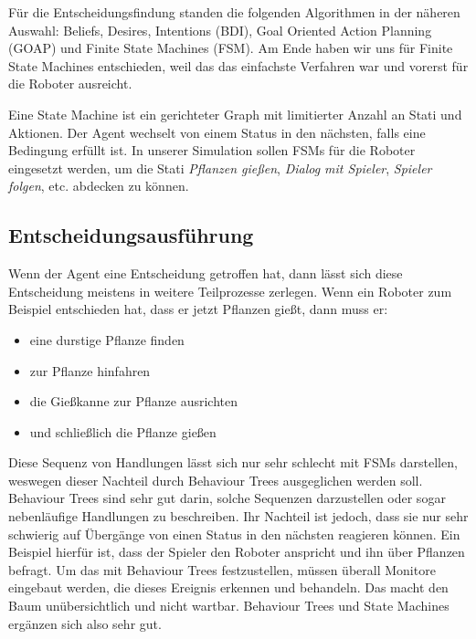 Für die Entscheidungsfindung standen die folgenden Algorithmen in der näheren Auswahl: Beliefs, Desires, Intentions (BDI), Goal Oriented Action Planning (GOAP) und Finite State Machines (FSM). Am Ende haben wir uns für Finite State Machines entschieden, weil das das einfachste Verfahren war und vorerst für die Roboter ausreicht.

Eine State Machine ist ein gerichteter Graph mit limitierter Anzahl an Stati und Aktionen. Der Agent wechselt von einem Status in den nächsten, falls eine Bedingung erfüllt ist. In unserer Simulation sollen FSMs für die Roboter eingesetzt werden, um die Stati \textit{Pflanzen gießen}, \textit{Dialog mit Spieler}, \textit{Spieler folgen}, etc. abdecken zu können. 

\subsection{Entscheidungsausführung}

Wenn der Agent eine Entscheidung getroffen hat, dann lässt sich diese Entscheidung meistens in weitere Teilprozesse zerlegen. Wenn ein Roboter zum Beispiel entschieden hat, dass er jetzt Pflanzen gießt, dann muss er:

\begin{itemize}
\item eine durstige Pflanze finden
\item zur Pflanze hinfahren
\item die Gießkanne zur Pflanze ausrichten
\item und schließlich die Pflanze gießen
\end{itemize}

Diese Sequenz von Handlungen lässt sich nur sehr schlecht mit FSMs darstellen, weswegen dieser Nachteil durch Behaviour Trees ausgeglichen werden soll. Behaviour Trees sind sehr gut darin, solche Sequenzen darzustellen oder sogar nebenläufige Handlungen zu beschreiben. Ihr Nachteil ist jedoch, dass sie nur sehr schwierig auf Übergänge von einen Status in den nächsten reagieren können. Ein Beispiel hierfür ist, dass der Spieler den Roboter anspricht und ihn über Pflanzen befragt. Um das mit Behaviour Trees festzustellen, müssen überall Monitore eingebaut werden, die dieses Ereignis erkennen und behandeln. Das macht den Baum unübersichtlich und nicht wartbar. Behaviour Trees und State Machines ergänzen sich also sehr gut.

